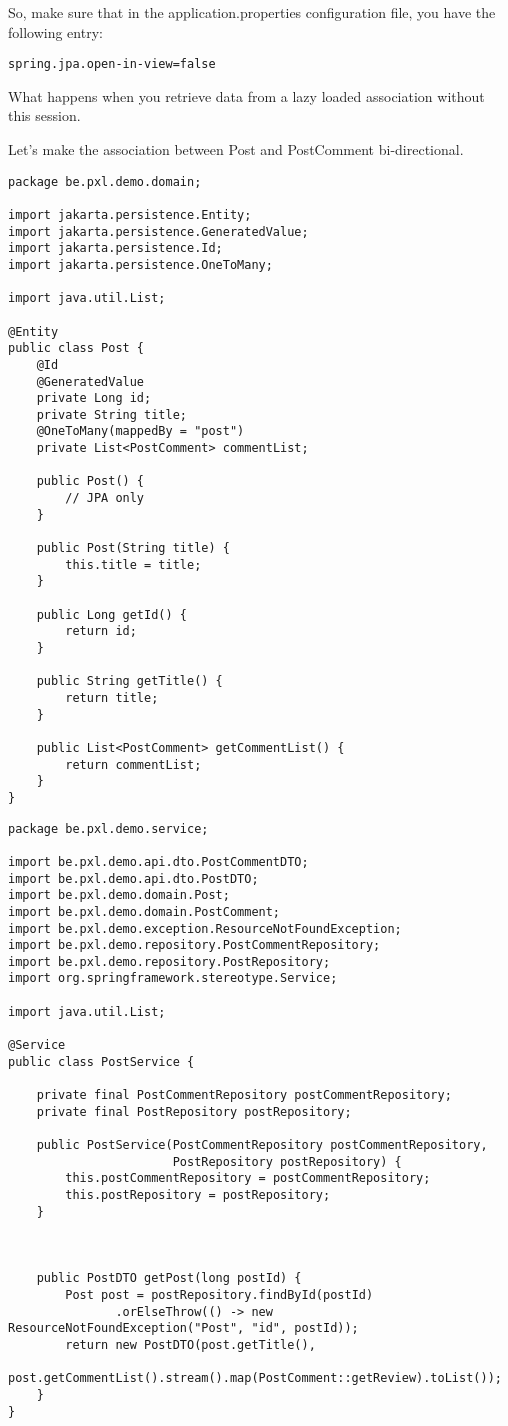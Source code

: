 So, make sure that in the application.properties configuration file, you have the following entry:

\begin{lstlisting}
spring.jpa.open-in-view=false
\end{lstlisting}

What happens when you retrieve data from a lazy loaded association without this session.

Let's make the association between Post and PostComment bi-directional.

\begin{lstlisting}
package be.pxl.demo.domain;

import jakarta.persistence.Entity;
import jakarta.persistence.GeneratedValue;
import jakarta.persistence.Id;
import jakarta.persistence.OneToMany;

import java.util.List;

@Entity
public class Post {
	@Id
	@GeneratedValue
	private Long id;
	private String title;
	@OneToMany(mappedBy = "post")
	private List<PostComment> commentList;

	public Post() {
		// JPA only
	}

	public Post(String title) {
		this.title = title;
	}

	public Long getId() {
		return id;
	}

	public String getTitle() {
		return title;
	}

	public List<PostComment> getCommentList() {
		return commentList;
	}
}
\end{lstlisting}

\begin{lstlisting}
package be.pxl.demo.service;

import be.pxl.demo.api.dto.PostCommentDTO;
import be.pxl.demo.api.dto.PostDTO;
import be.pxl.demo.domain.Post;
import be.pxl.demo.domain.PostComment;
import be.pxl.demo.exception.ResourceNotFoundException;
import be.pxl.demo.repository.PostCommentRepository;
import be.pxl.demo.repository.PostRepository;
import org.springframework.stereotype.Service;

import java.util.List;

@Service
public class PostService {

    private final PostCommentRepository postCommentRepository;
    private final PostRepository postRepository;

    public PostService(PostCommentRepository postCommentRepository,
                       PostRepository postRepository) {
        this.postCommentRepository = postCommentRepository;
        this.postRepository = postRepository;
    }

   

    public PostDTO getPost(long postId) {
        Post post = postRepository.findById(postId)
               .orElseThrow(() -> new ResourceNotFoundException("Post", "id", postId));
        return new PostDTO(post.getTitle(), 
                 post.getCommentList().stream().map(PostComment::getReview).toList());
    }
}
\end{lstlisting}

